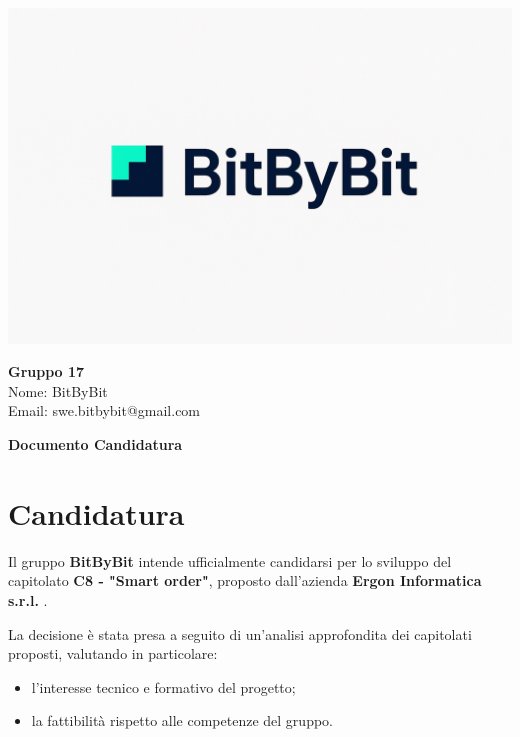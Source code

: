 \documentclass[a4paper,12pt]{article}
\begin{document}
\begin{center}
    \begin{minipage}{0.25\textwidth}
        \centering
        \includegraphics[width=\linewidth]{logo.png}
    \end{minipage}
    \hfill
    \begin{minipage}{0.7\textwidth}
        \raggedright
        {\LARGE \textbf{Gruppo 17}}\\[0.3cm]
        {\large
        Nome: BitByBit\\
        Email: swe.bitbybit@gmail.com
        }
    \end{minipage}
\end{center}

\vspace{1.5cm}

\begin{center}
    {\LARGE \textbf{Documento Candidatura}}
\end{center}

\vspace*{\fill}

\clearpage

\clearpage
\tableofcontents
\thispagestyle{empty} %
\clearpage


\section{Candidatura}
Il gruppo \textbf{BitByBit} intende ufficialmente candidarsi per lo sviluppo del capitolato \textbf{C8 - "Smart order"}, proposto dall’azienda \textbf{Ergon Informatica s.r.l.} .

La decisione è stata presa a seguito di un’analisi approfondita dei capitolati proposti, valutando in particolare:
\begin{itemize}
    \item l’interesse tecnico e formativo del progetto;
    \item la fattibilità rispetto alle competenze del gruppo.
\end{itemize}
\end{document}
